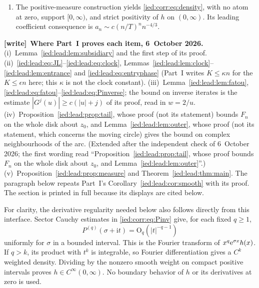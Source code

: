 \documentclass[11pt,letterpaper]{article}
\theoremstyle{remark}\newtheorem{remark}[theorem]{Remark}
\newcommand{\ii}{\mathrm i}\newcommand{\dd}{\,\mathrm d}
\newcommand{\Oh}{\mathrm O}\newcommand{\supp}{\operatorname{supp}}
\newenvironment{writenote}[1][]{\par\smallskip\begingroup\small
 \noindent\textbf{[write]}\if\relax\detokenize{#1}\relax\else~\textbf{#1.}\fi\ }%
 {\par\endgroup\smallskip}
\begin{document}
\begin{enumerate}[label=\textup{(\roman*)}]
\begin{equation}\label{ied:corr:eq:oldtaildisk}
 |z-r\e^{\ii t/n}|\le b|t|/n^2
       \quad\Longrightarrow\quad |F_n(z)|\le C/|t|.
\end{equation}
For the outer angles $\delta\le|\theta|\le\pi$, the compact arc $\zeta\approx T\e^{\ii\theta}$ has fixed complex neighborhoods on which $F_n(\zeta/n)=\Oh(n^{-1})$. These neighborhoods follow from the bounded ODE profile
$\zeta\tan(\zeta u/2+\pi/4)$ for $0\le u\le1$ away from its positive pole. Both are bounds on two-dimensional analytic neighborhoods, not merely on one-dimensional arcs.
\item The positive-measure construction yields \eqref{ied:corr:eq:density}, with no atom at zero, support $[0,\infty)$, and strict positivity of $h$ on $(0,\infty)$. Its leading coefficient consequence is $a_n\sim c(n/T)^n n^{-4/3}$.
\end{enumerate}

\begin{writenote}[Where Part~I proves each item, 6~October 2026]
(i)~Lemma~\ref{ied:lead:lem:subsidiary} and the first step of its proof. (ii)~\eqref{ied:lead:eq:JL}--\eqref{ied:lead:eq:clock}, Lemmas~\ref{ied:lead:lem:clock}--\ref{ied:lead:lem:entrance} and \eqref{ied:lead:eq:entryphase} (Part~I writes $K\le\kappa n$ for the $K\le\epsilon n$ here; this $\kappa$ is not the clock constant). (iii)~Lemma~\ref{ied:lead:lem:fatou}, \eqref{ied:lead:eq:fatou}--\eqref{ied:lead:eq:Pinverse}; the bound on inverse iterates is the estimate $|G^j(u)|\ge c(|u|+j)$ of its proof, read in $w=2/u$. (iv)~Proposition~\ref{ied:lead:prop:tail}, whose proof (not its statement) bounds $F_n$ on the whole disk about $z_0$, and Lemma~\ref{ied:lead:lem:outer}, whose proof (not its statement, which concerns the moving circle) gives the bound on complex neighbourhoods of the arc. \textup{(Extended after the independent check of 6~October 2026; the first wording read ``Proposition~\ref{ied:lead:prop:tail}, whose proof bounds $F_n$ on the whole disk about $z_0$, and Lemma~\ref{ied:lead:lem:outer}''.)} (v)~Proposition~\ref{ied:lead:prop:measure} and Theorem~\ref{ied:lead:thm:main}. The paragraph below repeats Part~I's Corollary~\ref{ied:lead:cor:smooth} with its proof. The section is printed in full because its displays are cited below.
\end{writenote}

For clarity, the derivative regularity needed below also follows directly from this interface. Sector Cauchy estimates in \eqref{ied:corr:eq:Pinv} give, for each fixed $q\ge1$,
\begin{equation}\label{ied:corr:eq:Pderivative}
 P^{(q)}(\sigma+\ii t)=\Oh_q(|t|^{-q-1})
\end{equation}
uniformly for $\sigma$ in a bounded interval. This is the Fourier transform of $x^q\mathrm e^{\sigma x}h(x)$. If $q>k$, its product with $t^k$ is integrable, so Fourier differentiation gives a $C^k$ weighted density. Dividing by the nonzero smooth weight on compact positive intervals proves $h\in C^\infty(0,\infty)$. No boundary behavior of $h$ or its derivatives at zero is used.
\end{document}
